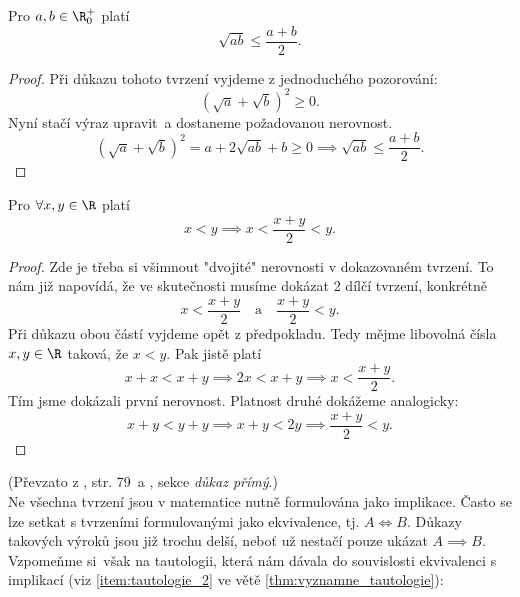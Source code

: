 \begin{proposition}[AG nerovnost]
    Pro $a,b\in\R_0^+$ platí
    \begin{equation*}
        \sqrt{ab}\leq\dfrac{a+b}{2}.
    \end{equation*}
\end{proposition}
\begin{proof}
    Při důkazu tohoto tvrzení vyjdeme z jednoduchého pozorování:
    \begin{equation*}
        (\sqrt{a}+\sqrt{b})^2\geq 0.
    \end{equation*}
    Nyní stačí výraz upravit~a dostaneme požadovanou nerovnost.
    \begin{equation*}
        (\sqrt{a}+\sqrt{b})^2 = a+2\sqrt{ab}+b\geq 0 \implies \sqrt{ab}\leq \dfrac{a+b}{2}.
    \end{equation*}
\end{proof}
\begin{proposition}
    Pro $\forall x,y\in\R$ platí
    \begin{equation*}
        x<y \implies x<\dfrac{x+y}{2}<y.
    \end{equation*}
\end{proposition}
\begin{proof}
    Zde je třeba si všimnout "dvojité" nerovnosti v dokazovaném tvrzení. To nám již napovídá, že ve skutečnosti musíme dokázat 2 dílčí tvrzení, konkrétně
    \begin{equation*}
        x < \dfrac{x+y}{2}\quad\text{a}\quad\dfrac{x+y}{2} < y.
    \end{equation*}
    Při důkazu obou částí vyjdeme opět z předpokladu. Tedy mějme libovolná čísla $x,y\in\R$ taková, že $x<y$. Pak jistě platí
    \begin{equation*}
        x+x<x+y \implies 2x<x+y \implies x<\dfrac{x+y}{2}.
    \end{equation*}
    Tím jsme dokázali první nerovnost. Platnost druhé dokážeme analogicky:
    \begin{equation*}
        x+y<y+y \implies x+y<2y \implies \dfrac{x+y}{2}<y.
    \end{equation*}
\end{proof}
(Převzato z \cite{ChartrandPolimeniZhang2014}, str. 79~a \cite{MatematickaLogikaUK2010}, sekce \emph{důkaz přímý}.)\\
Ne všechna tvrzení jsou v matematice nutně formulována jako implikace. Často se lze setkat s tvrzeními formulovanými jako ekvivalence, tj. $A \iff B$. Důkazy takových výroků jsou již trochu delší, neboť už nestačí pouze ukázat $A \implies B$. Vzpomeňme si~však na tautologii, která nám dávala do souvislosti ekvivalenci s implikací (viz \ref{item:tautologie_2} ve větě \ref{thm:vyznamne_tautologie}):
